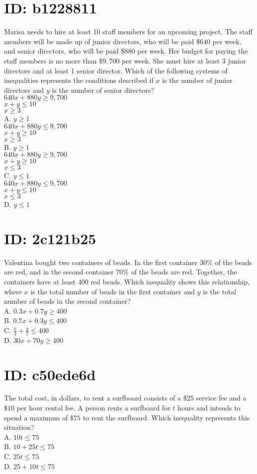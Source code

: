 \section*{ID: b1228811}
Marisa needs to hire at least 10 staff members for an upcoming project. The staff members will be made up of junior directors, who will be paid $\$ 640$ per week, and senior directors, who will be paid $\$ 880$ per week. Her budget for paying the staff members is no more than $\$ 9,700$ per week. She must hire at least 3 junior directors and at least 1 senior director. Which of the following systems of inequalities represents the conditions described if $x$ is the number of junior directors and $y$ is the number of senior directors?\\
$640 x+880 y \geq 9,700$\\
$x+y \leq 10$\\
$x \geq 3$\\
A. $y \geq 1$\\
$640 x+880 y \leq 9,700$\\
$x+y \geq 10$\\
$x \geq 3$\\
B. $y \geq 1$\\
$640 x+880 y \geq 9,700$\\
$x+y \geq 10$\\
$x \leq 3$\\
C. $y \leq 1$\\
$640 x+880 y \leq 9,700$\\
$x+y \leq 10$\\
$x \leq 3$\\
D. $y \leq 1$

\section*{ID: 2c121b25}
Valentina bought two containers of beads. In the first container 30\% of the beads are red, and in the second container $70 \%$ of the beads are red. Together, the containers have at least 400 red beads. Which inequality shows this relationship, where $x$ is the total number of beads in the first container and $y$ is the total number of beads in the second container?\\
A. $0.3 x+0.7 y \geq 400$\\
B. $0.7 x+0.3 y \leq 400$\\
C. $\frac{x}{3}+\frac{y}{7} \leq 400$\\
D. $30 x+70 y \geq 400$

\section*{ID: c50ede6d}
The total cost, in dollars, to rent a surfboard consists of a $\$ 25$ service fee and a $\$ 10$ per hour rental fee. A person rents a surfboard for $t$ hours and intends to spend a maximum of $\$ 75$ to rent the surfboard. Which inequality represents this situation?\\
A. $10 t \leq 75$\\
B. $10+25 t \leq 75$\\
C. $25 t \leq 75$\\
D. $25+10 t \leq 75$

